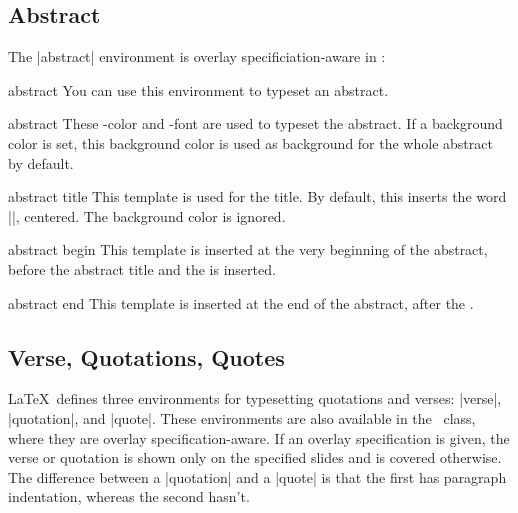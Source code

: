 \subsection{Abstract}

The |{abstract}| environment is overlay specificiation-aware in \beamer:

\begin{environment}{{abstract}}
  You can use this environment to typeset an abstract.

  \begin{element}{abstract}\no\yes\yes
    These \beamer-color and -font are used to typeset the abstract. If a background color is set, this background color is used as background for the whole abstract by default.
  \end{element}

  \begin{element}{abstract title}\yes\yes\yes
    This template is used for the title. By default, this inserts the word |\abstractname|, centered. The background color is ignored.
  \end{element}

  \begin{element}{abstract begin}\yes\no\no
    This template is inserted at the very beginning of the abstract, before the abstract title and the  is inserted.
  \end{element}

  \begin{element}{abstract end}\yes\no\no
    This template is inserted at the end of the abstract, after the .
  \end{element}
\end{environment}


\subsection{Verse, Quotations, Quotes}

\LaTeX\ defines three environments for typesetting quotations and verses: |verse|, |quotation|, and |quote|. These environments are also available in the \beamer\ class, where they are overlay specification-aware. If an overlay specification is given, the verse or quotation is shown only on the specified slides and is covered otherwise. The difference between a |quotation| and a |quote| is that the first has paragraph indentation, whereas the second hasn't.

